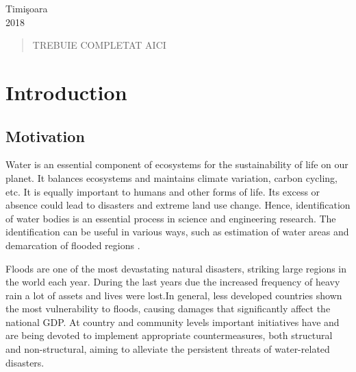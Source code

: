 \documentclass[12pt, a4paper]{report}
\begin{document}
\begin{titlepage}
\vfill
{\large Timi\c{s}oara\\ 2018}\\ %

 


\end{titlepage}

\begin{abstract} %
\vspace{1.0cm}



TREBUIE COMPLETAT AICI

\end{abstract} %


\newpage{}

\chapter{Introduction} 

\setcounter{page}{1}


\section{Motivation}
\quad
Water is an essential component of ecosystems for the sustainability of life on our planet. It balances ecosystems and maintains climate variation, carbon cycling, etc. It is equally important to humans and other forms of life. Its excess or absence could lead to disasters and extreme land use change. Hence, identification of water bodies is an essential process in science and engineering research. The identification can be useful in various ways, such as estimation of water areas and demarcation of flooded regions \cite {Rover, Alsdorf}.
\par 

Floods are one of the most devastating natural disasters, striking large regions in the world each year. During the last years due the increased frequency of heavy rain a lot of assets and lives were lost.In general, less developed countries shown the most vulnerability to floods, causing damages that significantly affect the national GDP. At country and community levels important initiatives have and are being devoted to implement appropriate countermeasures, both structural and non-structural, aiming to alleviate the persistent threats of water-related disasters. \cite{Flood-forecasting} 
\par
\end{document}
